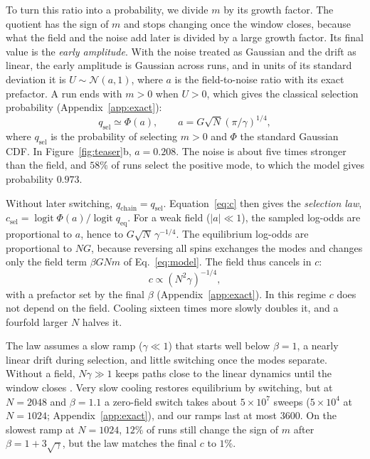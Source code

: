 \documentclass[final]{dynafront2026}
\newcommand{\qeq}{q_{\mathrm{eq}}}
\newcommand{\qchain}{q_{\mathrm{chain}}}
\DeclareMathOperator{\logit}{logit}
\begin{document}
To turn this ratio into a probability, we divide $m$ by its growth factor.
The quotient has the sign of $m$ and stops changing once the window closes,
because what the field and the noise add later is divided by a large growth
factor. Its final value is the \emph{early amplitude}. With the noise treated
as Gaussian and the drift as linear, the early amplitude is Gaussian across
runs, and in units of its standard deviation it is $U\sim\mathcal N(a,1)$,
where $a$ is the field-to-noise ratio with its exact prefactor. A run ends
with $m>0$ when $U>0$, which gives the classical selection probability
\citep{kondepudinelson1983,kondepudigao1987} (Appendix~\ref{app:exact}):
\begin{equation}
 q_{\mathrm{sel}}\simeq\Phi(a),\qquad a=G\sqrt N(\pi/\gamma)^{1/4},
 \label{eq:law}
\end{equation}
where $q_{\mathrm{sel}}$ is the probability of selecting $m>0$ and $\Phi$
the standard Gaussian CDF. In Figure~\ref{fig:teaser}b, $a=0.208$. The noise
is about five times stronger than the field, and $58\%$ of runs select the
positive mode, to which the model gives probability $0.973$.

Without later switching, $\qchain=q_{\mathrm{sel}}$. Equation~\eqref{eq:c}
then gives the \emph{selection law},
$c_{\mathrm{sel}}=\logit\Phi(a)/\logit\qeq$. For a weak field ($|a|\ll1$),
the sampled log-odds are proportional to $a$, hence to
$G\sqrt N\,\gamma^{-1/4}$. The equilibrium log-odds are proportional to $NG$,
because reversing all spins exchanges the modes and changes only the
field term $\beta GNm$ of Eq.~\eqref{eq:model}. The field thus cancels in $c$:
\begin{equation}
 c\propto(N^2\gamma)^{-1/4},
 \label{eq:scaling}
\end{equation}
with a prefactor set by the final $\beta$ (Appendix~\ref{app:exact}). In this
regime $c$ does not depend on the field. Cooling sixteen times more slowly
doubles it, and a fourfold larger $N$ halves it.

The law assumes a slow ramp ($\gamma\ll1$) that starts well below $\beta=1$,
a nearly linear drift during selection, and little switching once the modes separate. Without
a field, $N\gamma\gg1$ keeps paths close to the linear dynamics until the
window closes \citep{berglundgentz2002}. Very slow cooling restores
equilibrium by switching, but at $N=2048$ and $\beta=1.1$ a zero-field switch takes
about $5\times10^{7}$ sweeps ($5\times10^{4}$ at $N=1024$; Appendix~\ref{app:exact}), and our
ramps last at most $3600$. On the slowest ramp at $N=1024$, $12\%$ of runs still change the sign of $m$ after $\beta=1+3\sqrt\gamma$, but the law matches the final $c$ to $1\%$.
\end{document}
